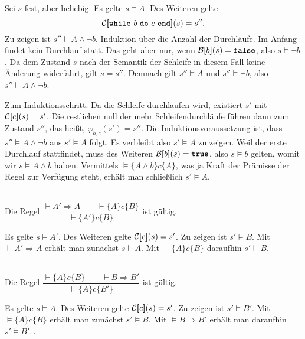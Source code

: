 \begin{Beweis}[Beweis]
Sei $s$ fest, aber beliebig. Es gelte $s\models A$. Des Weiteren gelte
\[\evC\qb{\text{\kw{while} $b$ \kw{do} $c$ \kw{end}}}(s) = s''.\]
Zu zeigen ist $s''\models A\land\lnot b$. Induktion über die
Anzahl der Durchläufe. Im Anfang findet kein Durchlauf statt. Das
geht aber nur, wenn $\evB\qb{b}(s)=\kw{false}$, also $s\models\lnot b$.
Da dem Zustand $s$ nach der Semantik der Schleife in diesem Fall keine Änderung
widerfährt, gilt $s=s''$. Demnach gilt $s''\models A$ und $s''\models\lnot b$,
also $s''\models A\land\lnot b$.

Zum Induktionsschritt. Da die Schleife durchlaufen wird, existiert
$s'$ mit $\mathcal C[\hspace{-2.6pt}[c]\hspace{-2.4pt}](s)=s'$. Die restlichen null der mehr Schleifendurchläufe
führen dann zum Zustand $s''$, das heißt, $\varphi_{b,c}(s')=s''$.
Die Induktionsvoraussetzung ist, dass $s''\models A\land\lnot b$
aus $s'\models A$ folgt. Es verbleibt also $s'\models A$ zu zeigen.
Weil der erste Durchlauf stattfindet, muss des Weiteren $\evB\qb{b}(s)=\kw{true}$,
also $s\models b$ gelten, womit wir $s\models A\land b$ haben.
Vermittels $\models\{A\land b\}c\{A\}$, was ja Kraft der Prämisse der Regel
zur Verfügung steht, erhält man schließlich $s'\models A$.\,\qedsymbol
\end{Beweis}

\begin{Satz}\mbox{}\\[4pt]
Die Regel $\dfrac{\vdash A'\Rightarrow A\qquad\vdash\{A\}c\{B\}}{
\vdash\{A'\}c\{B\}}$ ist gültig.
\end{Satz}
\begin{Beweis}
Es gelte $s\models A'$. Des Weiteren gelte $\mathcal C[\hspace{-2.6pt}[c]\hspace{-2.4pt}](s)=s'$. Zu zeigen
ist $s'\models B$. Mit $\models A'\Rightarrow A$ erhält man zunächst
$s\models A$. Mit $\models\{A\}c\{B\}$ daraufhin $s'\models B$.\,\qedsymbol
\end{Beweis}

\begin{Satz}\mbox{}\\[4pt]
Die Regel $\dfrac{\vdash\{A\}c\{B\}\qquad\vdash B\Rightarrow B'}{
\vdash\{A\}c\{B'\}}$ ist gültig.
\end{Satz}
\begin{Beweis}
Es gelte $s\models A$. Des Weiteren gelte $\mathcal C[\hspace{-2.6pt}[c]\hspace{-2.4pt}](s)=s'$.
Zu zeigen ist $s'\models B'$. Mit $\models\{A\}c\{B\}$ erhält man
zunächst $s'\models B$. Mit $\models B\Rightarrow B'$ erhält man
daraufhin $s'\models B'$.\,\qedsymbol.
\end{Beweis}


